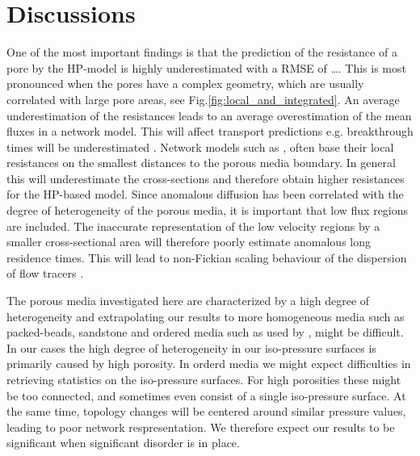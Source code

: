 \documentclass[draft]{agujournal2019}
\begin{document}
\section{Discussions}

One of the most important findings is that the prediction of the resistance of a pore by the HP-model is highly underestimated with a RMSE of \ldots. This is most pronounced when the pores have a complex geometry, which are usually correlated with large pore areas, see Fig.\ref{fig:local_and_integrated}. An average underestimation of the resistances leads to an average overestimation of the mean fluxes in a network model. This will affect transport predictions e.g. breakthrough times will be underestimated \cite{dentz_mechanisms_2018}. Network models such as \cite{alim_local_2017}, often base their local resistances on the smallest distances to the porous media boundary. In general this will underestimate the cross-sections and therefore obtain higher resistances for the HP-based model. Since anomalous diffusion has been correlated with the degree of heterogeneity of the porous media, it is important that low flux regions are included. The inaccurate representation of the low velocity regions by a smaller cross-sectional area will therefore poorly estimate anomalous long residence times. This will lead to non-Fickian scaling behaviour of the dispersion of flow tracers \cite{dentz_mechanisms_2018,dentz_delay_2006}.

The porous media investigated here are characterized by a high degree of heterogeneity and extrapolating our results to more homogeneous media such as packed-beads, sandstone and ordered media such as used by \cite{alim_local_2017}, might be difficult. In our cases the high degree of heterogeneity in our iso-pressure surfaces is primarily caused by high porosity. In orderd media we might expect difficulties in retrieving statistics on the iso-pressure surfaces. For high porosities these might be too connected, and sometimes even consist of a single iso-pressure surface. At the same time, topology changes will be centered around similar pressure values, leading to poor network respresentation. We therefore expect our results to be significant when significant disorder is in place. 
\end{document}
